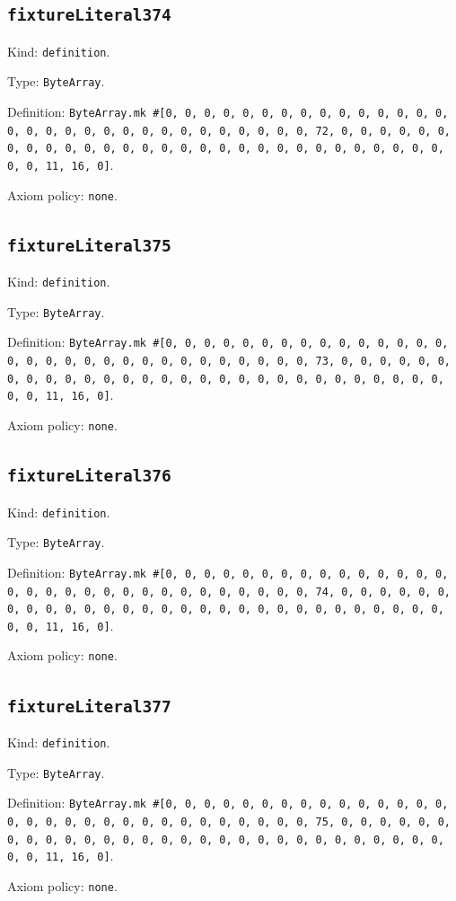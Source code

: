 \documentclass[11pt]{article}
\begin{document}
\subsection*{\texttt{fixtureLiteral374}}
\noindent Kind: \texttt{definition}.\par
\noindent Type: \texttt{ByteArray}.\par
\noindent Definition: \texttt{ByteArray.mk \#[0, 0, 0, 0, 0, 0, 0, 0, 0, 0, 0, 0, 0, 0, 0, 0, 0, 0, 0, 0, 0, 0, 0, 0, 0, 0, 0, 0, 0, 0, 0, 72, 0, 0, 0, 0, 0, 0, 0, 0, 0, 0, 0, 0, 0, 0, 0, 0, 0, 0, 0, 0, 0, 0, 0, 0, 0, 0, 0, 0, 0, 0, 0, 11, 16, 0]}.\par
\noindent Axiom policy: \texttt{none}.\par
\subsection*{\texttt{fixtureLiteral375}}
\noindent Kind: \texttt{definition}.\par
\noindent Type: \texttt{ByteArray}.\par
\noindent Definition: \texttt{ByteArray.mk \#[0, 0, 0, 0, 0, 0, 0, 0, 0, 0, 0, 0, 0, 0, 0, 0, 0, 0, 0, 0, 0, 0, 0, 0, 0, 0, 0, 0, 0, 0, 0, 73, 0, 0, 0, 0, 0, 0, 0, 0, 0, 0, 0, 0, 0, 0, 0, 0, 0, 0, 0, 0, 0, 0, 0, 0, 0, 0, 0, 0, 0, 0, 0, 11, 16, 0]}.\par
\noindent Axiom policy: \texttt{none}.\par
\subsection*{\texttt{fixtureLiteral376}}
\noindent Kind: \texttt{definition}.\par
\noindent Type: \texttt{ByteArray}.\par
\noindent Definition: \texttt{ByteArray.mk \#[0, 0, 0, 0, 0, 0, 0, 0, 0, 0, 0, 0, 0, 0, 0, 0, 0, 0, 0, 0, 0, 0, 0, 0, 0, 0, 0, 0, 0, 0, 0, 74, 0, 0, 0, 0, 0, 0, 0, 0, 0, 0, 0, 0, 0, 0, 0, 0, 0, 0, 0, 0, 0, 0, 0, 0, 0, 0, 0, 0, 0, 0, 0, 11, 16, 0]}.\par
\noindent Axiom policy: \texttt{none}.\par
\subsection*{\texttt{fixtureLiteral377}}
\noindent Kind: \texttt{definition}.\par
\noindent Type: \texttt{ByteArray}.\par
\noindent Definition: \texttt{ByteArray.mk \#[0, 0, 0, 0, 0, 0, 0, 0, 0, 0, 0, 0, 0, 0, 0, 0, 0, 0, 0, 0, 0, 0, 0, 0, 0, 0, 0, 0, 0, 0, 0, 75, 0, 0, 0, 0, 0, 0, 0, 0, 0, 0, 0, 0, 0, 0, 0, 0, 0, 0, 0, 0, 0, 0, 0, 0, 0, 0, 0, 0, 0, 0, 0, 11, 16, 0]}.\par
\noindent Axiom policy: \texttt{none}.\par
\end{document}
